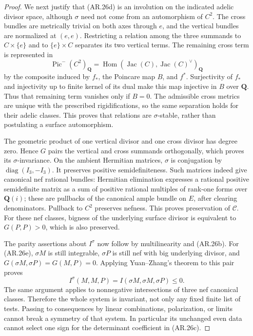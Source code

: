\begin{proof}
We next justify that (AR.26d) is an involution on the indicated
adelic divisor space, although $\sigma$ need not come from an
automorphism of $C^2$.  The cross bundles are metrically trivial
on both axes through $e$, and the vertical bundles are normalized
at $(e,e)$.  Restricting a relation among the three
summands to $C\times\{e\}$ and to $\{e\}\times C$ separates its
two vertical terms.  The remaining cross term is represented in
\[
 \operatorname{Pic}^{-}(C^2)_\mathbf Q
   =\operatorname{Hom}(\operatorname{Jac}(C),
                       \operatorname{Jac}(C)^\vee)_\mathbf Q
\]
by the composite induced by $f_*$, the Poincare map $B$, and $f^*$.
Surjectivity of $f_*$ and injectivity up to finite kernel of its dual
make this map injective in $B$ over $\mathbf Q$.  Thus that remaining
term vanishes only if $B=0$.  The admissible cross metrics are unique
with the prescribed rigidifications, so the same separation holds
for their adelic classes.  This proves that relations are
$\sigma$-stable, rather than postulating a surface automorphism.

The geometric product of one vertical divisor and one cross divisor
has degree zero.  Hence $G$ pairs the vertical and cross summands
orthogonally, which proves its $\sigma$-invariance.  On the ambient
Hermitian matrices, $\sigma$ is conjugation by
$\operatorname{diag}(I_3,-I_3)$.  It preserves positive
semidefiniteness.  Such matrices indeed give canonical nef rational
bundles: Hermitian elimination expresses a rational positive
semidefinite matrix as a sum of positive rational multiples of
rank-one forms over $\mathbf Q(i)$; these are pullbacks of the
canonical ample bundle on $E$, after clearing denominators.
Pullback to $C^2$ preserves nefness.  This proves preservation of
$\mathcal C$.  For these nef classes, bigness of the underlying
surface divisor is equivalent to $G(P,P)>0$, which is also
preserved.

The parity assertions about $I^\sigma$ now follow by multilinearity
and (AR.26b).  For (AR.26e), $\sigma M$ is still integrable,
$\sigma P$ is still nef with big underlying divisor, and
$G(\sigma M,\sigma P)=G(M,P)=0$.  Applying Yuan--Zhang's theorem
to this pair proves
\[
 I^\sigma(M,M,P)=I(\sigma M,\sigma M,\sigma P)\le0.
\]
The same argument applies to nonnegative intersections of three nef
canonical classes.  Therefore the whole system is invariant, not
only any fixed finite list of tests.  Passing to consequences by
linear combinations, polarization, or limits cannot break a
symmetry of that system.  In particular its unchanged even data
cannot select one sign for the determinant coefficient in
(AR.26c).


\end{proof}

